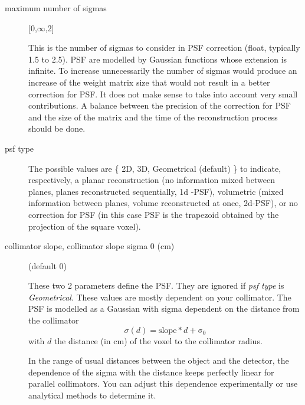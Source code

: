 \documentclass{article}
\begin{document}
\begin{description}
\item[maximum number of sigmas] [0,$\infty$,2{]}

  This is the number of sigmas to consider in PSF correction (float, typically 1.5 to 2.5). PSF are
  modelled by Gaussian functions whose extension is infinite. To increase unnecessarily the number of
  sigmas would produce an increase of the weight matrix size that would not result in a better correction
  for PSF. It does not make sense to take into account very small contributions. A balance between the
  precision of the correction for PSF and the size of the matrix and the time of the reconstruction
  process should be done.

%	

\item[psf type] 
 
  The possible values are \{ 2D, 3D, Geometrical (default) \} to indicate, respectively, a planar
  reconstruction (no information mixed between planes, planes reconstructed sequentially, 1d -PSF),
  volumetric (mixed information between planes, volume reconstructed at once, 2d-PSF), or no correction
  for PSF (in this case PSF is the trapezoid obtained by the projection of the square voxel).

\item[collimator slope, collimator slope sigma 0 (cm)] (default 0) 

  These two 2 parameters define the PSF.
  They are ignored if \textit{psf type} is \textit{Geometrical}.  These values are mostly dependent on
  your collimator.  The PSF is modelled as a Gaussian with sigma dependent on the distance from the
  collimator
\begin{equation}
 \sigma(d) = \mathrm{slope} * d + \mathrm{\sigma_0}
\end{equation} \noindent
  with $d$ the distance (in cm) of the voxel to the collimator radius.

  In the range of usual distances between the object and the detector, the dependence of the sigma with the
  distance keeps perfectly linear for parallel collimators. You can adjust this dependence experimentally
  or use analytical methods to determine it.


\end{description}
\end{document}
